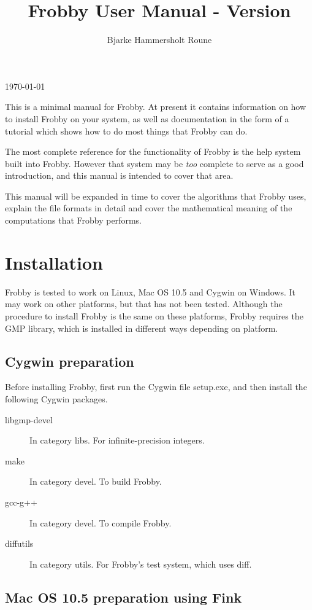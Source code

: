 \documentclass{amsart}
\author{Bjarke Hammersholt Roune}
\title{Frobby User Manual - Version \frobbyVersion}
\theoremstyle{definition}
\begin{document}
\maketitle
\today

\tableofcontents

This is a minimal manual for Frobby. At present it contains
information on how to install Frobby on your system, as well as
documentation in the form of a tutorial which shows how to do most
things that Frobby can do.

The most complete reference for the functionality of Frobby is the
help system built into Frobby. However that system may be \emph{too}
complete to serve as a good introduction, and this manual is intended
to cover that area.

This manual will be expanded in time to cover the algorithms that
Frobby uses, explain the file formats in detail and cover the
mathematical meaning of the computations that Frobby performs.

\section{Installation}

Frobby is tested to work on Linux, Mac OS 10.5 and Cygwin on
Windows. It may work on other platforms, but that has not been
tested. Although the procedure to install Frobby is the same on these
platforms, Frobby requires the GMP library, which is installed in
different ways depending on platform.

\subsection{Cygwin preparation}

Before installing Frobby, first run the Cygwin file setup.exe, and
then install the following Cygwin packages.

\begin{description}
\item[libgmp-devel] In category libs. For infinite-precision integers.
\item[make] In category devel. To build Frobby.
\item[gcc-g++] In category devel. To compile Frobby.
\item[diffutils] In category utils. For Frobby's test system, which uses diff.
\end{description}

\subsection{Mac OS 10.5 preparation using Fink}
\end{document}
